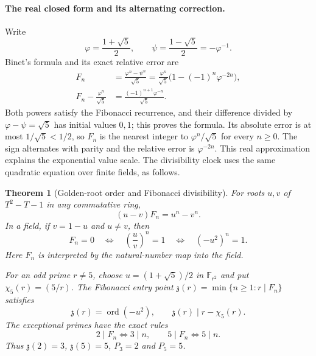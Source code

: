 \documentclass[11pt]{article}
\newtheorem{theorem}{Theorem}[section]
\theoremstyle{definition}
\begin{document}
\paragraph{The real closed form and its alternating correction.}
Write
\[
 \varphi=\frac{1+\sqrt5}{2},\qquad
 \psi=\frac{1-\sqrt5}{2}=-\varphi^{-1}.
\]
Binet's formula and its exact relative error are
\begin{align*}
 F_n&=\frac{\varphi^n-\psi^n}{\sqrt5}
     =\frac{\varphi^n}{\sqrt5}
       \bigl(1-(-1)^n\varphi^{-2n}\bigr),\\
 F_n-\frac{\varphi^n}{\sqrt5}
     &=\frac{(-1)^{n+1}\varphi^{-n}}{\sqrt5}.
\end{align*}
Both powers satisfy the Fibonacci recurrence, and their difference
divided by $\varphi-\psi=\sqrt5$ has initial values $0,1$;
this proves the formula. Its absolute error is at most
$1/\sqrt5<1/2$, so $F_n$ is the nearest integer to
$\varphi^n/\sqrt5$ for every $n\ge0$.
The sign alternates with parity and the relative error is
$\varphi^{-2n}$. This real approximation explains the exponential
value scale. The divisibility clock uses the same quadratic equation
over finite fields, as follows.

\begin{theorem}[Golden-root order and Fibonacci divisibility]
\label{thm:fibonacci-golden-clock}
For roots $u,v$ of $T^2-T-1$ in any commutative ring,
\[
 (u-v)F_n=u^n-v^n.
\]
In a field, if $v=1-u$ and $u\ne v$, then
\[
 F_n=0
 \quad\Longleftrightarrow\quad
 \left(\frac{u}{v}\right)^n=1
 \quad\Longleftrightarrow\quad
 (-u^2)^n=1.
\]
Here $F_n$ is interpreted by the natural-number map into the field.

For an odd prime $r\ne5$, choose
$u=(1+\sqrt5)/2$ in $\mathbb F_{r^2}$ and put
$\chi_5(r)=(5/r)$. The Fibonacci entry point
$\mathfrak z(r)=\min\{n\ge1:r\mid F_n\}$ satisfies
\[
 \mathfrak z(r)=\operatorname{ord}(-u^2),
 \qquad
 \mathfrak z(r)\mid r-\chi_5(r).
\]
The exceptional primes have the exact rules
\[
 2\mid F_n\Longleftrightarrow3\mid n,\qquad
 5\mid F_n\Longleftrightarrow5\mid n.
\]
Thus $\mathfrak z(2)=3$, $\mathfrak z(5)=5$,
$P_3=2$ and $P_5=5$.
\end{theorem}
\end{document}
